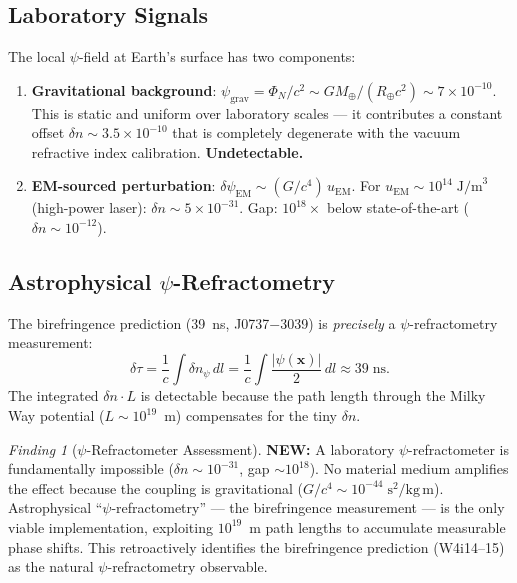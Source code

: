 \documentclass[11pt]{article}
\theoremstyle{definition}
\theoremstyle{remark}
\newtheorem{finding}[theorem]{Finding}
\newcommand{\ee}[1]{\times10^{#1}}
\newcommand{\newresult}[1]{\textcolor{green!50!black}{\textbf{NEW:} #1}}
\begin{document}
\subsection{Laboratory Signals}

The local $\psi$-field at Earth's surface has two components:
\begin{enumerate}[nosep]
\item \textbf{Gravitational background}: $\psi_{\mathrm{grav}}
  = \Phi_N/c^2 \sim GM_\oplus/(R_\oplus c^2) \sim 7\ee{-10}$.
  This is static and uniform over laboratory scales ---
  it contributes a constant offset $\delta n \sim 3.5\ee{-10}$
  that is completely degenerate with the vacuum refractive index
  calibration.  \textbf{Undetectable.}
\item \textbf{EM-sourced perturbation}: $\delta\psi_{\mathrm{EM}}
  \sim (G/c^4)\,u_{\mathrm{EM}}$.  For $u_{\mathrm{EM}} \sim
  10^{14}\;\mathrm{J/m}^3$ (high-power laser):
  $\delta n \sim 5\ee{-31}$.  Gap: $10^{18}\times$ below
  state-of-the-art ($\delta n \sim 10^{-12}$).
\end{enumerate}

\subsection{Astrophysical $\psi$-Refractometry}

The birefringence prediction (39~ns, J0737$-$3039) is
\emph{precisely} a $\psi$-refractometry measurement:
\begin{equation}
\delta\tau = \frac{1}{c}\int \delta n_\psi\,dl
  = \frac{1}{c}\int \frac{|\psi(\mathbf{x})|}{2}\,dl
  \approx 39\;\mathrm{ns}.
\end{equation}
The integrated $\delta n \cdot L$ is detectable because
the path length through the Milky Way potential
($L \sim 10^{19}$~m) compensates for the tiny $\delta n$.

\begin{finding}[$\psi$-Refractometer Assessment]
\label{find:refrac}
\newresult{A laboratory $\psi$-refractometer is fundamentally
impossible ($\delta n \sim 10^{-31}$, gap $\sim 10^{18}$).
No material medium amplifies the effect because the coupling
is gravitational ($G/c^4 \sim 10^{-44}\;\mathrm{s}^2/\mathrm{kg\,m}$).
Astrophysical ``$\psi$-refractometry'' --- the birefringence
measurement --- is the only viable implementation, exploiting
$10^{19}$~m path lengths to accumulate measurable phase shifts.
This retroactively identifies the birefringence prediction
(W4i14--15) as the natural $\psi$-refractometry observable.}
\end{finding}
\end{document}

